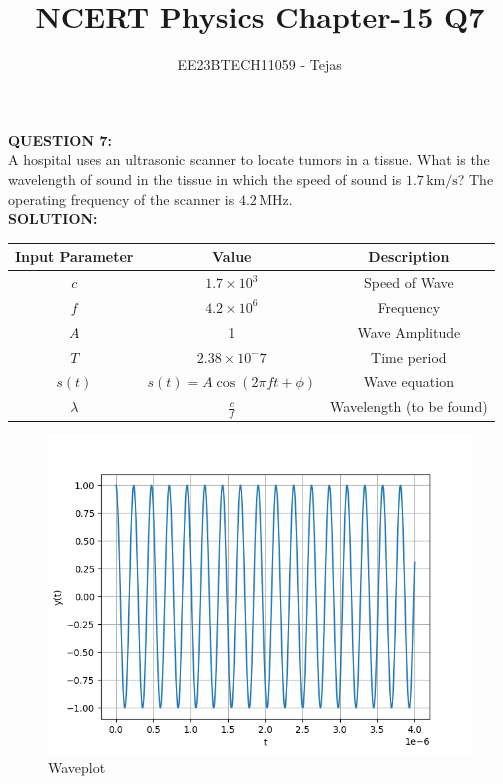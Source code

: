 \documentclass[journal,12pt,twocolumn]{IEEEtran}
\theoremstyle{remark}
\begin{document}


\vspace{3cm}

\title{NCERT Physics Chapter-15 Q7}
\author{EE23BTECH11059 - Tejas$^{}$}
\maketitle

\newpage

\Huge \textbf{QUESTION 7:} \\

\medskip
\Large
A hospital uses an ultrasonic scanner to locate tumors in a tissue. What is the
wavelength of sound in the tissue in which the speed of sound is $1.7 \, \text{km/s}$? The operating frequency of the scanner is $4.2 \, \text{MHz}$.
\bigskip
\\
\Large
\textbf{SOLUTION:} \\
\begin{table}[h]
    \centering  
    \begin{tabular}{|c|c|c|}
        \hline
        Input Parameter & Value & Description \\
        \hline
        $c$ & $1.7\times10^3$ & Speed of Wave  \\
        \hline
        $f$ & $4.2\times10^6$ & Frequency  \\
        \hline
        $A$ & 1 & Wave Amplitude \\
        \hline
        $T$ & $2.38\times10^-7$ & Time period \\
        \hline
        $s(t)$ & $s(t)=A\cos(2\pi f t+\phi)$ & Wave equation \\
        \hline
        $\lambda$ & $\frac{c}{f}$ & Wavelength (to be found) \\
        \hline
    \end{tabular}
\end{table} 
\begin{figure}[h]
    \centering
    \includegraphics[width=\columnwidth]{images/plot.png}
    \caption{Waveplot}
    \label{fig:Plot1}
\end{figure}
\end{document}
